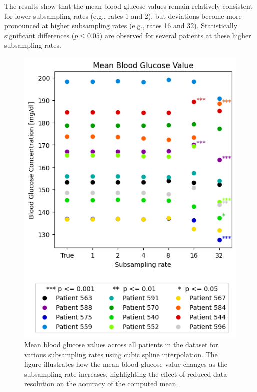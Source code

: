 The results show that the mean blood glucose values remain relatively consistent for lower subsampling rates (e.g., rates 1 and 2), but deviations become more pronounced at higher subsampling rates (e.g., rates 16 and 32). Statistically significant differences ($p \le 0.05$) are observed for several patients at these higher subsampling rates. 
\begin{figure}[h] %
	\centering
	\includegraphics[width=\linewidth]{Figures/all_patients_mean_cbg_values.png} %
	\caption{Mean blood glucose values across all patients in the dataset for various subsampling rates using cubic spline interpolation. The figure illustrates how the mean blood glucose value changes as the subsampling rate increases, highlighting the effect of reduced data resolution on the accuracy of the computed mean.}
	\label{fig:patients_mean}  %
\end{figure}

